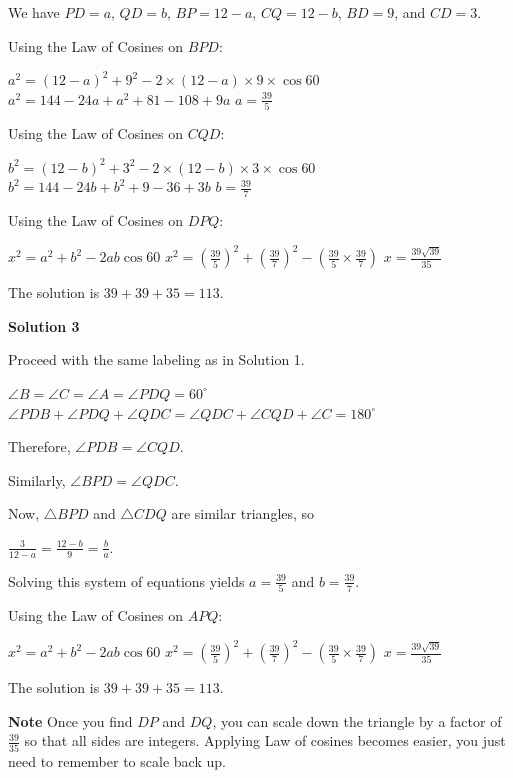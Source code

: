 \begin{enumerate}
 We have $PD = a$, $QD = b$, $BP = 12 - a$, $CQ = 12 - b$, $BD = 9$, and $CD = 3$.

 Using the Law of Cosines on $BPD$:

 $a^{2} = (12 - a)^{2} + 9^{2} - 2 \times (12 - a) \times 9 \times \cos{60}$
$a^{2} = 144 - 24a + a^{2} + 81 - 108 + 9a$
$a = \frac{39}{5}$

 Using the Law of Cosines on $CQD$:

 $b^{2} = (12 - b)^{2} +3^{2} - 2 \times (12 - b) \times 3 \times \cos{60}$
$b^{2} = 144 - 24b + b^{2} + 9 - 36 + 3b$
$b = \frac{39}{7}$

 Using the Law of Cosines on $DPQ$:

 $x^{2} = a^{2} + b^{2} - 2ab \cos{60}$
$x^{2} = (\frac{39}{5})^2 + (\frac{39}{7})^2 - (\frac{39}{5} \times \frac{39}{7})$
$x = \frac{39 \sqrt{39}}{35}$

 The solution is $39 + 39 + 35 = \boxed{113}$.

 



\textbf{Solution 3}

Proceed with the same labeling as in Solution 1. 

 $\angle B = \angle C = \angle A = \angle PDQ = 60^\circ$
$\angle PDB + \angle PDQ + \angle QDC = \angle QDC + \angle CQD + \angle C = 180^\circ$

 Therefore, $\angle PDB = \angle CQD$.

 Similarly, $\angle BPD = \angle QDC$.

 Now, $\bigtriangleup BPD$ and $\bigtriangleup CDQ$ are similar triangles, so

 $\frac{3}{12-a} = \frac{12-b}{9} = \frac{b}{a}$.

 Solving this system of equations yields $a = \frac{39}{5}$ and $b = \frac{39}{7}$.

 Using the Law of Cosines on $APQ$:

 $x^{2} = a^{2} + b^{2} - 2ab \cos{60}$
$x^{2} = (\frac{39}{5})^2 + (\frac{39}{7})^2 - (\frac{39}{5} \times \frac{39}{7})$
$x = \frac{39 \sqrt{39}}{35}$

 The solution is $39 + 39 + 35 = \boxed{113}$.

 \textbf{Note} Once you find $DP$ and $DQ$, you can scale down the triangle by a factor of $\frac{39}{35}$ so that all sides are integers. Applying Law of cosines becomes easier, you just need to remember to scale back up.

 




\end{enumerate}
